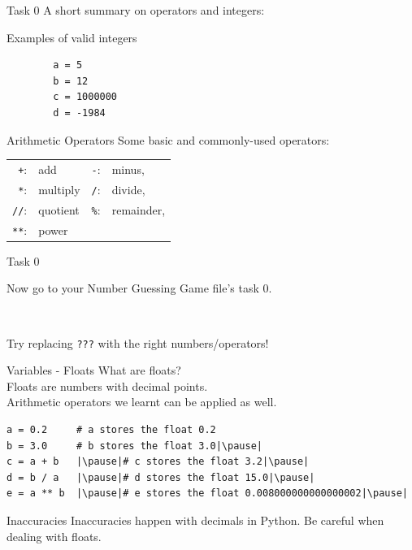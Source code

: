 \documentclass[dvipsnames, svgnames, x11names]{beamer}
\begin{document}
\begin{frame}[fragile]{Task 0}
    A short summary on operators and integers:
    \begin{block}{Examples of valid integers}
        \begin{verbatim}
        a = 5       
        b = 12      
        c = 1000000   
        d = -1984
        \end{verbatim}
    \end{block}
    \begin{block}{Arithmetic Operators}
        Some basic and commonly-used operators:\\
        \centering
        \begin{tabular}{rlrl}
        \texttt{+}:& add & \texttt{-}:& minus,\\
        \texttt{*}:& multiply & \texttt{/}:& divide,\\
        \texttt{//}:& quotient & \texttt{\%}:& remainder,\\
        \texttt{**}:& power &&
        \end{tabular}
    \end{block}
\end{frame}

\begin{frame}[fragile]{Task 0}
    \begin{center}
        Now go to your Number Guessing Game file's task 0.

        \

        Try replacing \texttt{???} with the right numbers/operators!
    \end{center}
\end{frame}
    
\begin{frame}[fragile]{Variables - Floats}
What are floats?\pause\\
Floats are numbers with decimal points.\pause\\
Arithmetic operators we learnt can be applied as well.
\begin{verbatim}
a = 0.2     # a stores the float 0.2
b = 3.0     # b stores the float 3.0|\pause|
c = a + b   |\pause|# c stores the float 3.2|\pause|
d = b / a   |\pause|# d stores the float 15.0|\pause|
e = a ** b  |\pause|# e stores the float 0.008000000000000002|\pause|
\end{verbatim}
\begin{alertblock}{Inaccuracies}
Inaccuracies happen with decimals in Python. Be careful when dealing with floats.
\end{alertblock}
\end{frame}
\end{document}
